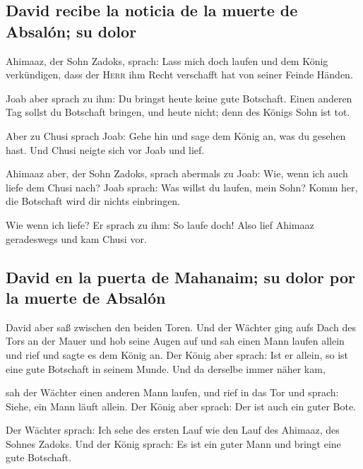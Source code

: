 \hypertarget{david-recibe-la-noticia-de-la-muerte-de-absaluxf3n-su-dolor}{%
\subsection{David recibe la noticia de la muerte de Absalón; su
dolor}\label{david-recibe-la-noticia-de-la-muerte-de-absaluxf3n-su-dolor}}

 Ahimaaz, der Sohn Zadoks, sprach: Lass mich doch laufen
und dem König verkündigen, dass der \textsc{Herr} ihm Recht verschafft
hat von seiner Feinde Händen.

 Joab aber sprach zu ihm: Du bringst heute keine gute
Botschaft. Einen anderen Tag sollst du Botschaft bringen, und heute
nicht; denn des Königs Sohn ist tot.

 Aber zu Chusi sprach Joab: Gehe hin und sage dem König
an, was du gesehen hast. Und Chusi neigte sich vor Joab und lief.

 Ahimaaz aber, der Sohn Zadoks, sprach abermals zu Joab:
Wie, wenn ich auch liefe dem Chusi nach? Joab sprach: Was willst du
laufen, mein Sohn? Komm her, die Botschaft wird dir nichts einbringen.

 Wie wenn ich liefe? Er sprach zu ihm: So laufe doch!
Also lief Ahimaaz geradeswegs und kam Chusi vor.

\hypertarget{david-en-la-puerta-de-mahanaim-su-dolor-por-la-muerte-de-absaluxf3n}{%
\subsection{David en la puerta de Mahanaim; su dolor por la muerte de
Absalón}\label{david-en-la-puerta-de-mahanaim-su-dolor-por-la-muerte-de-absaluxf3n}}

 David aber saß zwischen den beiden Toren. Und der
Wächter ging aufs Dach des Tors an der Mauer und hob seine Augen auf und
sah einen Mann laufen allein  und rief und sagte es dem
König an. Der König aber sprach: Ist er allein, so ist eine gute
Botschaft in seinem Munde. Und da derselbe immer näher kam,

 sah der Wächter einen anderen Mann laufen, und rief in
das Tor und sprach: Siehe, ein Mann läuft allein. Der König aber sprach:
Der ist auch ein guter Bote.

 Der Wächter sprach: Ich sehe des ersten Lauf wie den
Lauf des Ahimaaz, des Sohnes Zadoks. Und der König sprach: Es ist ein
guter Mann und bringt eine gute Botschaft.

